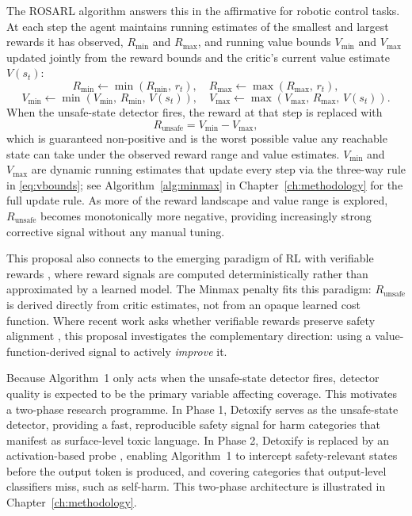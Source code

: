 \documentclass[a4paper,twoside,12pt]{report}
\newcommand{\runsafe}{R_{\text{unsafe}}}
\newcommand{\vmin}{V_{\min}}
\newcommand{\vmax}{V_{\max}}
\newcommand{\rmin}{R_{\min}}
\newcommand{\rmax}{R_{\max}}
\begin{document}
The ROSARL algorithm \citep{nanguetasse2026} answers this in the affirmative for robotic
control tasks. At each step the agent maintains running estimates of the smallest and
largest rewards it has observed, $\rmin$ and $\rmax$, and running value bounds $\vmin$
and $\vmax$ updated jointly from the reward bounds and the critic's current value
estimate $V(s_t)$:
\begin{equation}
  \rmin \leftarrow \min(\rmin,\, r_t), \quad
  \rmax \leftarrow \max(\rmax,\, r_t),
  \label{eq:rminmax}
\end{equation}
\begin{equation}
  \vmin \leftarrow \min(\vmin,\, \rmin,\, V(s_t)), \quad
  \vmax \leftarrow \max(\vmax,\, \rmax,\, V(s_t)).
  \label{eq:vbounds}
\end{equation}
When the unsafe-state detector fires, the reward at that step is replaced with
\begin{equation}
  \runsafe = \vmin - \vmax,
  \label{eq:minmax}
\end{equation}
which is guaranteed non-positive and is the worst possible value any reachable state can
take under the observed reward range and value estimates. $\vmin$ and $\vmax$ are dynamic
running estimates that update every step via the three-way rule in
\eqref{eq:vbounds}; see Algorithm~\ref{alg:minmax} in Chapter~\ref{ch:methodology} for the
full update rule. As more of the reward landscape and value range is explored, $\runsafe$
becomes monotonically more negative, providing increasingly strong corrective signal
without any manual tuning.

This proposal also connects to the emerging paradigm of RL with verifiable rewards
\citep{lambert2024rlvr, youssef2025grpo, su2025crossingreward}, where reward signals are
computed deterministically rather than approximated by a learned model. The Minmax penalty
fits this paradigm: $\runsafe$ is derived directly from critic estimates, not from an opaque
learned cost function. Where recent work asks whether verifiable rewards preserve safety
alignment \citep{safetyrlvr2025}, this proposal investigates the complementary direction:
using a value-function-derived signal to actively \emph{improve} it.

Because Algorithm~1 only acts when the unsafe-state detector fires, detector quality is
expected to be the primary variable affecting coverage. This motivates a two-phase research
programme. In Phase 1, Detoxify \citep{hanu2020detoxify} serves as the unsafe-state
detector, providing a fast, reproducible safety signal for harm categories that manifest as
surface-level toxic language. In Phase 2, Detoxify is replaced by an activation-based probe
\citep{rateike2023, han2025safeswitch}, enabling Algorithm~1 to intercept safety-relevant
states before the output token is produced, and covering categories that output-level
classifiers miss, such as self-harm. This two-phase architecture is illustrated in
Chapter~\ref{ch:methodology}.
\end{document}

